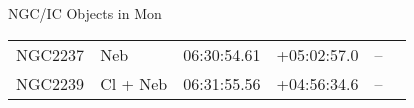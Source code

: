 \begin{block}{NGC/IC Objects in Mon}
  \centering
  \begin{tabularx}{\textwidth}{llrrll} \toprule 
    NGC2237 & Neb & 06:30:54.61 & +05:02:57.0  & -- \\ 
    NGC2239 & Cl + Neb & 06:31:55.56 & +04:56:34.6  & -- \\ 
  \end{tabularx}
\end{block}